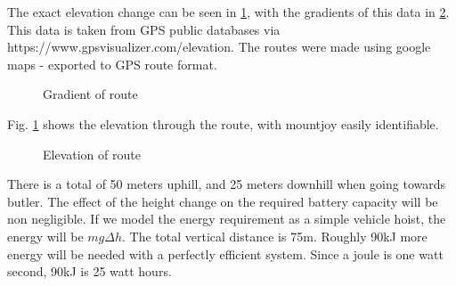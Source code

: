 \documentclass{article}
\begin{document}
The exact elevation change can be seen in \ref{fig:route_el}, with the gradients of this data in \ref{fig:route_grad}.
This data is taken from GPS public databases via https://www.gpsvisualizer.com/elevation.
The routes were made using google maps - exported to GPS route format.
\begin{figure}[H]
    \centering
    \caption{Gradient of route}
    \label{fig:route_el}
\end{figure}
Fig. \ref{fig:route_el} shows the elevation through the route, with mountjoy easily identifiable. 
\begin{figure}[H]
    \centering
    \caption{Elevation of route}
    \label{fig:route_grad}
\end{figure}
There is a total of 50 meters uphill, and 25 meters downhill when going towards butler.
The effect of the height change on the required battery capacity will be non negligible.
If we model the energy requirement as a simple vehicle hoist, the energy will be $mg\Delta h$.
The total vertical distance is 75m.
Roughly 90kJ more energy will be needed with a perfectly efficient system.
Since a joule is one watt second, 90kJ is 25 watt hours.
\end{document}

